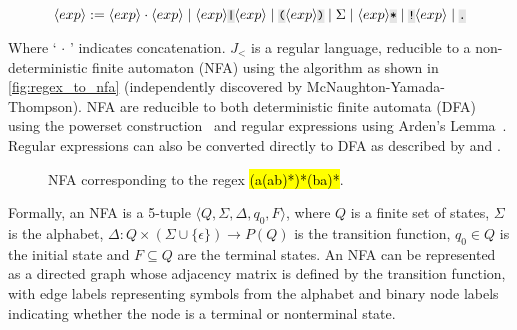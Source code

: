 \documentclass{article}
\newcommand*{\tinline}[1]{{\sethlcolor{slightgray}\ttfamily\footnotesize\relax\hl{#1}}}
\begin{document}
\begin{equation}\label{eq:grammar}
    \bnfrl{exp} := \bnfrl{exp}\cdot\bnfrl{exp} \mor \bnfrl{exp}\code{|}\bnfrl{exp} \mor \code{(}\bnfrl{exp}\code{)} \mor \Sigma \mor \bnfrl{exp}\code{*} \mor \code{!}\bnfrl{exp} \mor \code{.}
\end{equation}

Where ` $\cdot$ ' indicates concatenation. $J_<$ is a regular language, reducible to a non-deterministic finite automaton (NFA) using the \citet{glushkov1961abstract} algorithm as shown in \autoref{fig:regex_to_nfa} (independently discovered by McNaughton-Yamada-Thompson). NFA are reducible to both deterministic finite automata (DFA) using the powerset construction~\citep{rabin1959finite} and regular expressions using Arden's Lemma~\citep{arden1961delayed}. Regular expressions can also be converted directly to DFA as described by \citet{brzozowski1964derivatives} and \citet{berry1986regular}.

\begin{figure}
    \caption{NFA corresponding to the regex \tinline{(a(ab)*)*(ba)*}.}
    \label{fig:regex_to_nfa}
\end{figure}

Formally, an NFA is a 5-tuple $\langle Q, \Sigma, \Delta, q_0, F \rangle$, where $Q$ is a finite set of states, $\Sigma$ is the alphabet, $\Delta :Q\times (\Sigma \cup \{\epsilon \})\rightarrow P(Q)$ is the transition function, $q_0 \in Q$ is the initial state and $F \subseteq Q$ are the terminal states. An NFA can be represented as a directed graph whose adjacency matrix is defined by the transition function, with edge labels representing symbols from the alphabet and binary node labels indicating whether the node is a terminal or nonterminal state.
\end{document}
